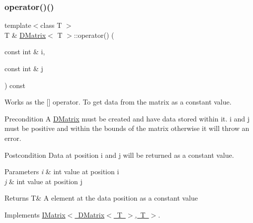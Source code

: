 \mbox{\label{class_d_matrix_a001f8f4ec1a2152ad5fe770072b6609d}} 
\subsubsection{\texorpdfstring{operator()()}{operator()()}\hspace{0.1cm}{\footnotesize\ttfamily [2/2]}}
{\footnotesize\ttfamily template$<$class T $>$ \\
T \& \mbox{\hyperlink{class_d_matrix}{D\+Matrix}}$<$ T $>$\+::operator() (\begin{DoxyParamCaption}\item[{const int \&}]{i,  }\item[{const int \&}]{j }\end{DoxyParamCaption}) const\hspace{0.3cm}{\ttfamily [virtual]}}



Works as the \mbox{[}\mbox{]} operator. To get data from the matrix as a constant value. 

\begin{DoxyPrecond}{Precondition}
A \mbox{\hyperlink{class_d_matrix}{D\+Matrix}} must be created and have data stored within it. i and j must be positive and within the bounds of the matrix otherwise it will throw an error. 
\end{DoxyPrecond}
\begin{DoxyPostcond}{Postcondition}
Data at position i and j will be returned as a constant value.
\end{DoxyPostcond}

\begin{DoxyParams}{Parameters}
{\em i} & int value at position i \\
\hline
{\em j} & int value at position j \\
\hline
\end{DoxyParams}
\begin{DoxyReturn}{Returns}
T\& A element at the data position as a constant value 
\end{DoxyReturn}


Implements \mbox{\hyperlink{class_i_matrix_a2abf1a0d2454051da3ccf9cacf12797e}{I\+Matrix$<$ D\+Matrix$<$ T $>$, T $>$}}.

\mbox{\label{class_d_matrix_a36f86365c4ee760200acc4abfc5b27f2}} 
